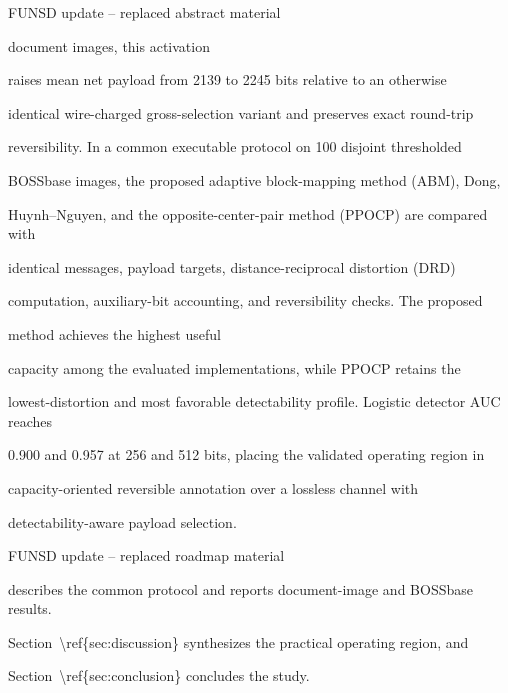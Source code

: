 \makeatletter
{}
\long{}

\expandafter\ExtractLegacyDeletionBody\LegacyTrackedSource\TrackedEnd

\begin{RevisionDeletion}
FUNSD update -- replaced abstract material\par
document images, this activation\par
raises mean net payload from 2139 to 2245 bits relative to an otherwise\par
identical wire-charged gross-selection variant and preserves exact round-trip\par
reversibility. In a common executable protocol on 100 disjoint thresholded\par
BOSSbase images, the proposed adaptive block-mapping method (ABM), Dong,\par
Huynh--Nguyen, and the opposite-center-pair method (PPOCP) are compared with\par
identical messages, payload targets, distance-reciprocal distortion (DRD)\par
computation, auxiliary-bit accounting, and reversibility checks. The proposed\par
method achieves the highest useful\par
capacity among the evaluated implementations, while PPOCP retains the\par
lowest-distortion and most favorable detectability profile. Logistic detector AUC reaches\par
0.900 and 0.957 at 256 and 512 bits, placing the validated operating region in\par
capacity-oriented reversible annotation over a lossless channel with\par
detectability-aware payload selection.\par
\end{RevisionDeletion}

\begin{RevisionDeletion}
FUNSD update -- replaced roadmap material\par
describes the common protocol and reports document-image and BOSSbase results.\par
Section~\textbackslash{}ref\{sec:discussion\} synthesizes the practical operating region, and\par
Section~\textbackslash{}ref\{sec:conclusion\} concludes the study.\par
\end{RevisionDeletion}

